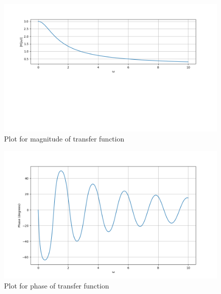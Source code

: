 \documentclass[journal,12pt,twocolumn]{IEEEtran}
\theoremstyle{remark}
\begin{document}
\begin{figure}[h!]
    \centering
    \includegraphics[width=\columnwidth]{freq.png}
    \caption{Plot for magnitude of transfer function}
    \label{fig:gate2022in11fig1}
\end{figure}
\begin{figure}[h!]
    \centering
    \includegraphics[width=\columnwidth]{phase.png}
    \caption{Plot for phase of transfer function}
    \label{fig:gate2022in11fig2}
\end{figure}
\end{document}
